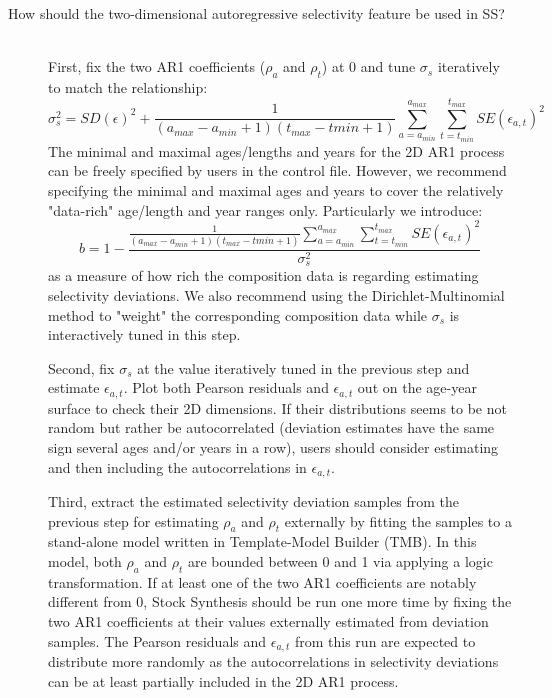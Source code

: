 \begin{description}
	\item[How should the two-dimensional autoregressive selectivity feature be used in SS?]\hfil\\
	First, fix the two AR1 coefficients ($\rho_a$ and $\rho_t$) at 0 and tune $\sigma_s$ iteratively to match the relationship:
	\begin{equation}
		\sigma_s^2=SD(\epsilon)^2+\frac{1}{(a_{max}-a_{min}+1)(t_{max}-t{min}+1)}\sum_{a=a_{min}}^{a_{max}}\sum_{t=t_{min}}^{t_{max}}SE(\epsilon_{a,t})^2
	\end{equation}
	The minimal and maximal ages/lengths and years for the 2D AR1 process can be freely specified by users in the control file. However, we recommend specifying the minimal and maximal ages and years to cover the relatively "data-rich" age/length and year ranges only. Particularly we introduce: 
	\begin{equation}
		b=1-\frac{\frac{1}{(a_{max}-a_{min}+1)(t_{max}-t{min}+1)}\sum_{a=a_{min}}^{a_{max}}\sum_{t=t_{min}}^{t_{max}}SE(\epsilon_{a,t})^2}{\sigma_s^2}
	\end{equation}
	as a measure of how rich the composition data is regarding estimating selectivity deviations. We also recommend using the Dirichlet-Multinomial method to "weight" the corresponding composition data while $\sigma_s$ is interactively tuned in this step.\\ 
	\par Second, fix $\sigma_s$ at the value iteratively tuned in the previous step and estimate $\epsilon_{a,t}$. Plot both Pearson residuals and $\epsilon_{a,t}$ out on the age-year surface to check their 2D dimensions. If their distributions seems to be not random but rather be autocorrelated (deviation estimates have the same sign several ages and/or years in a row), users should consider estimating and then including the autocorrelations in $\epsilon_{a,t}$.\\
	\par Third, extract the estimated selectivity deviation samples from the previous step for estimating $\rho_a$ and $\rho_t$ externally by fitting the samples to a stand-alone model written in Template-Model Builder (TMB). In this model, both $\rho_a$ and $\rho_t$ are bounded between 0 and 1 via applying a logic transformation. If at least one of the two AR1 coefficients are notably different from 0, Stock Synthesis should be run one more time by fixing the two AR1 coefficients at their values externally estimated from deviation samples. The Pearson residuals and $\epsilon_{a,t}$ from this run are expected to distribute more randomly as the  autocorrelations in selectivity deviations can be at least partially included in the 2D AR1 process.
\end{description}


